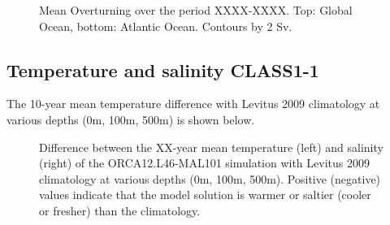 \begin{figure}[H]
\begin{center}
\caption{Mean Overturning over the period XXXX-XXXX. Top: Global Ocean, bottom: Atlantic Ocean. Contours by 2 Sv.}
\end{center}
\end{figure}

\subsection{Temperature and salinity CLASS1-1}

The 10-year mean temperature difference with Levitus 2009 climatology at various depths (0m, 100m, 500m) is shown below.

\begin{figure}[H]
\begin{center}
\begin{minipage}{0.47\linewidth}
\end{minipage}
\hfill
\begin{minipage}{0.47\linewidth}
\end{minipage}
\begin{minipage}{0.47\linewidth}
\end{minipage}
\hfill
\begin{minipage}{0.47\linewidth}
\end{minipage}
\begin{minipage}{0.47\linewidth}
\end{minipage}
\hfill
\begin{minipage}{0.47\linewidth}
\end{minipage}
\caption{Difference between the XX-year mean temperature (left) and salinity (right) of the ORCA12.L46-MAL101 simulation 
with Levitus 2009 climatology at various depths (0m, 100m, 500m). Positive (negative) values indicate 
that the model solution is warmer or saltier (cooler or fresher) than the climatology.}
\end{center}
\end{figure}

